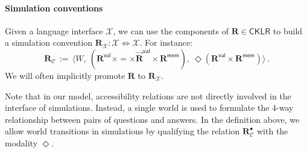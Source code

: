 \documentclass[sigplan,screen]{acmart}
\newcommand{\kw}[1]{\ensuremath{ \mathsf{#1} }}
\newcommand{\ans}{\bullet}
\newcommand{\vref}{\le_\kw{v}}
\newcommand{\mext}{\le_\kw{m}}
\newcommand{\pshift}{1.6ex}
\newcommand{\pcdist}{1}
\newcommand{\pcangle}{60}
\newcommand{\ph}[1]{%
  \tikz[remember picture]{\coordinate (#1);}}
\newcommand{\ptc}[2]{%
  \tikz[remember picture,baseline,>={Latex[round,length=3.6pt]}]{
    \draw[->,#2]
      let \p{dest} = (#1),
          \n1 = {pow(veclen(\x{dest}, \y{dest}), 0.5) * 1.5},
          \p1 = ($(0,0)+(0,\pshift)$),
          \p4 = ($(\x{dest},0)+(0,\pshift)$),
          \p2 = ($(\p1)!\n1*\pcdist!-\pcangle:(\p4)$),
          \p3 = ($(\p4)!\n1*\pcdist!+\pcangle:(\p1)$) in
        (\p1) .. controls (\p2) and (\p3) .. node[pos=0.5] (top) {} (\p4);
    \pgfresetboundingbox
    \path[use as bounding box] (0,0 |- top);
}}
\newcommand{\bpt}[1]{%
  \ptc{#1}{black,thick,>={Latex[round,length=4pt]}}}
\begin{document}

\paragraph{Simulation conventions} %

Given a language interface $\mathcal{X}$,
we can use the components of
$\mathbf{R} \in \kw{CKLR}$
to build a simulation convention
$\mathbf{R}_\mathcal{X} : \mathcal{X} \Leftrightarrow \mathcal{X}$.
For instance:
\[
  \mathbf{R}_\mathcal{C} \, := \,
    \big\langle
      W, \:
      (\mathbf{R}^\kw{val} \times {=} \times
       \vec{\mathbf{R}}^\kw{val} \times \mathbf{R}^\kw{mem}), \:
      \Diamond (\mathbf{R}^\kw{val} \times \mathbf{R}^\kw{mem})
    \big\rangle \,.
\]
We will often implicitly promote $\mathbf{R}$ to $\mathbf{R}_\mathcal{X}$.

Note that in our model,
accessibility relations are not directly involved
in the interface of simulations.
Instead,
a single world is used to formulate
the 4-way relationship between
pairs of questions and answers.
In the definition above,
we allow world transitions in simulations
by qualifying the relation $\mathbf{R}_\mathcal{C}^\ans$
with the modality $\Diamond$.

\end{document}
